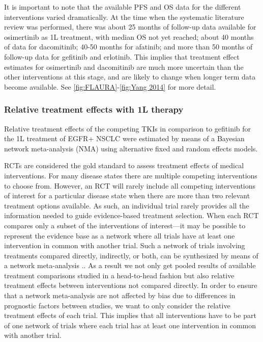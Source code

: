 \documentclass[11pt,final,fleqn]{article}\usepackage[]{graphicx}\usepackage[]{color}
\theoremstyle{plain}
\begin{document}
{It is important to note that the available PFS and OS data for the different interventions varied dramatically. At the time when the systematic literature review was performed, there was about 25 months of follow-up data available for osimertinib as 1L treatment, with median OS not yet reached; about 40 months of data for dacomitinib; 40-50 months for afatinib; and more than 50 months of follow-up data for gefitinib and erlotinib. This implies that treatment effect estimates for osimertinib and dacomitinib are much more uncertain than the other interventions at this stage, and are likely to change when longer term data become available. See \autoref{fig:FLAURA}-\autoref{fig:Yang 2014} for more detail.

\subsubsection{Relative treatment effects with 1L therapy}
Relative treatment effects of the competing TKIs in comparison to gefitinib for the 1L treatment of EGFR+ NSCLC were estimated by means of a Bayesian network meta-analysis (NMA) using alternative fixed and random effects models. 

RCTs are considered the gold standard to assess treatment effects of medical interventions. For many disease states there are multiple competing interventions to choose from. However, an RCT will rarely include all competing interventions of interest for a particular disease state when there are more than two relevant treatment options available. As such, an individual trial rarely provides all the information needed to guide evidence-based treatment selection. When each RCT compares only a subset of the interventions of interest---it may be possible to represent the evidence base as a network where all trials have at least one intervention in common with another trial. Such a network of trials involving treatments compared directly, indirectly, or both, can be synthesized by means of a network meta-analysis \citep[Chapter~1]{dias2018network}.. As a result we not only get pooled results of available treatment comparisons studied in a head-to-head fashion but also relative treatment effects between interventions not compared directly. In order to ensure that a network meta-analysis are not affected by bias due to differences in prognostic factors between studies, we want to only consider the relative treatment effects of each trial. This implies that all interventions have to be part of one network of trials where each trial has at least one intervention in common with another trial.  

}
\end{document}
